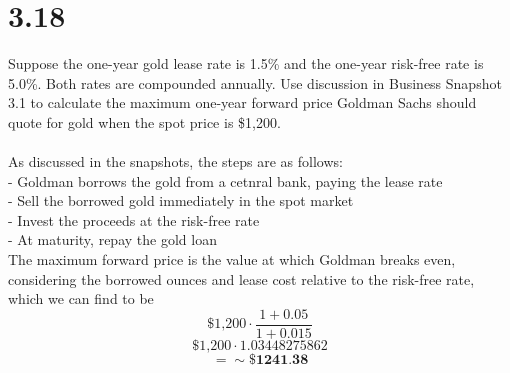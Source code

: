 \documentclass{article}
\begin{document}
{\Large 

\section*{3.18}

Suppose the one-year gold lease rate is 1.5\% and the one-year risk-free rate is 5.0\%. Both rates are compounded annually. Use discussion in Business Snapshot 3.1 to calculate the maximum one-year forward price Goldman Sachs should quote for gold when the spot price is \$1,200. \\ \\
As discussed in the snapshots, the steps are as follows: \\ 
- Goldman borrows the gold from a cetnral bank, paying the lease rate \\
- Sell the borrowed gold immediately in the spot market \\
- Invest the proceeds at the risk-free rate \\ 
- At maturity, repay the gold loan \\
The maximum forward price is the value at which Goldman breaks even, considering the borrowed ounces and lease cost relative to the risk-free rate, which we can find to be 
\[
  \text{\$1,200} \cdot \frac{ 1 + 0.05}{1 + 0.015}
\]
\[
  \text{\$1,200} \cdot 1.03448275862
\]
\[
  = \sim \textbf{\$1241.38}
\]

}
\end{document}
